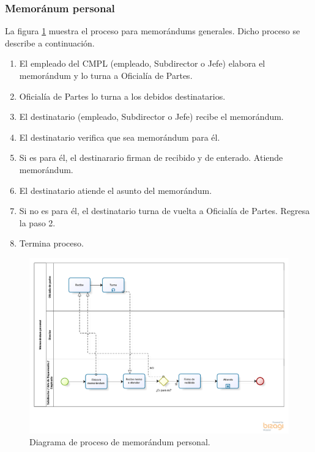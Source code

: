 	\subsubsection{Memoránum personal}
	La figura \ref{fig:MemoPersonal} muestra el proceso para memorándums generales. Dicho proceso se describe a continuación.
	
	\begin{enumerate}
		\item El empleado del CMPL (empleado, Subdirector o Jefe) elabora el memorándum y lo turna a Oficialía de Partes.
		\item Oficialía de Partes lo turna a los debidos destinatarios.
		\item El destinatario (empleado, Subdirector o Jefe) recibe el memorándum.
		\item El destinatario verifica que sea memorándum para él.
		\item Si es para él, el destinarario firman de recibido y de enterado. Atiende memorándum.
		\item El destinatario atiende el asunto del memorándum.
		\item Si no es para él, el destinatario turna de vuelta a Oficialía de Partes. Regresa la paso 2.
		\item Termina proceso.
	\end{enumerate}
	
	\begin{figure}[htbp!]
		\centering
			\includegraphics[width=1.2\textwidth]{images/antecedentes/memopersonal}
		\caption{Diagrama de proceso de memorándum personal.}
		\label{fig:MemoPersonal}
	\end{figure}
	

